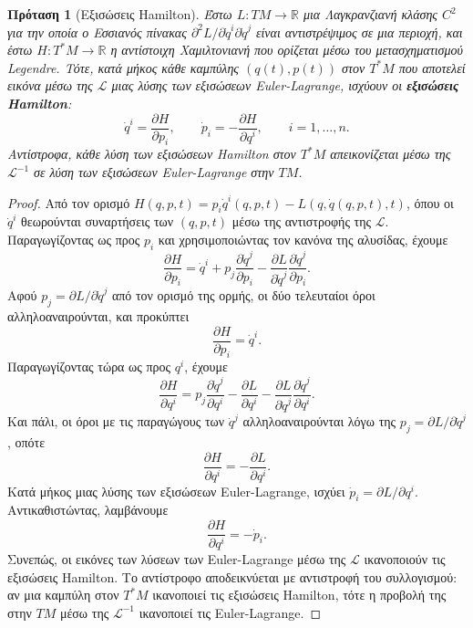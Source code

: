\documentclass[11pt,a4paper,twoside,openright]{book}
\newtheorem{proposition}[lemma]{Πρόταση}
\begin{document}
\begin{proposition}[Εξισώσεις Hamilton]
Έστω $L: TM \to \mathbb{R}$ μια Λαγκρανζιανή κλάσης $C^2$ για την οποία ο Εσσιανός πίνακας $\partial^2 L / \partial \dot{q}^i \partial \dot{q}^j$ είναι αντιστρέψιμος σε μια περιοχή, και έστω $H: T^*M \to \mathbb{R}$ η αντίστοιχη Χαμιλτονιανή που ορίζεται μέσω του μετασχηματισμού Legendre. Τότε, κατά μήκος κάθε καμπύλης $(q(t), p(t))$ στον $T^*M$ που αποτελεί εικόνα μέσω της $\mathcal{L}$ μιας λύσης των εξισώσεων Euler-Lagrange, ισχύουν οι \textbf{εξισώσεις Hamilton}:
\begin{equation}
\dot{q}^i = \frac{\partial H}{\partial p_i}, \qquad \dot{p}_i = -\frac{\partial H}{\partial q^i}, \qquad i = 1, \dots, n.
\end{equation}
Αντίστροφα, κάθε λύση των εξισώσεων Hamilton στον $T^*M$ απεικονίζεται μέσω της $\mathcal{L}^{-1}$ σε λύση των εξισώσεων Euler-Lagrange στην $TM$.
\end{proposition}

\begin{proof}
Από τον ορισμό $H(q, p, t) = p_i \dot{q}^i(q, p, t) - L(q, \dot{q}(q, p, t), t)$, όπου οι $\dot{q}^i$ θεωρούνται συναρτήσεις των $(q, p, t)$ μέσω της αντιστροφής της $\mathcal{L}$. Παραγωγίζοντας ως προς $p_i$ και χρησιμοποιώντας τον κανόνα της αλυσίδας, έχουμε
\begin{equation}
\frac{\partial H}{\partial p_i} = \dot{q}^i + p_j \frac{\partial \dot{q}^j}{\partial p_i} - \frac{\partial L}{\partial \dot{q}^j} \frac{\partial \dot{q}^j}{\partial p_i}.
\end{equation}
Αφού $p_j = \partial L / \partial \dot{q}^j$ από τον ορισμό της ορμής, οι δύο τελευταίοι όροι αλληλοαναιρούνται, και προκύπτει
\begin{equation}
\frac{\partial H}{\partial p_i} = \dot{q}^i.
\end{equation}
Παραγωγίζοντας τώρα ως προς $q^i$, έχουμε
\begin{equation}
\frac{\partial H}{\partial q^i} = p_j \frac{\partial \dot{q}^j}{\partial q^i} - \frac{\partial L}{\partial q^i} - \frac{\partial L}{\partial \dot{q}^j} \frac{\partial \dot{q}^j}{\partial q^i}.
\end{equation}
Και πάλι, οι όροι με τις παραγώγους των $\dot{q}^j$ αλληλοαναιρούνται λόγω της $p_j = \partial L / \partial \dot{q}^j$, οπότε
\begin{equation}
\frac{\partial H}{\partial q^i} = -\frac{\partial L}{\partial q^i}.
\end{equation}
Κατά μήκος μιας λύσης των εξισώσεων Euler-Lagrange, ισχύει $\dot{p}_i = \partial L / \partial q^i$. Αντικαθιστώντας, λαμβάνουμε
\begin{equation}
\frac{\partial H}{\partial q^i} = -\dot{p}_i.
\end{equation}
Συνεπώς, οι εικόνες των λύσεων των Euler-Lagrange μέσω της $\mathcal{L}$ ικανοποιούν τις εξισώσεις Hamilton. Το αντίστροφο αποδεικνύεται με αντιστροφή του συλλογισμού: αν μια καμπύλη στον $T^*M$ ικανοποιεί τις εξισώσεις Hamilton, τότε η προβολή της στην $TM$ μέσω της $\mathcal{L}^{-1}$ ικανοποιεί τις Euler-Lagrange.
\end{proof}
\end{document}
